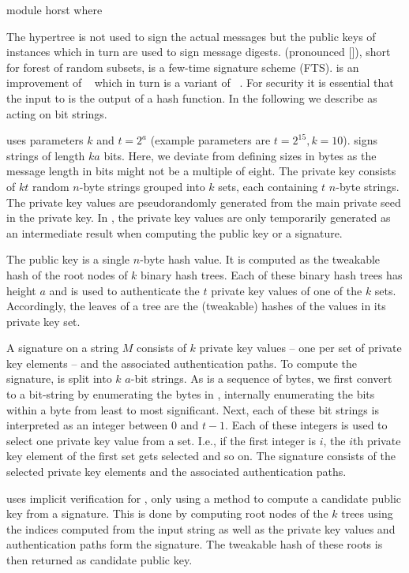 \begin{code}
  module horst where
\end{code}

The \spx hypertree \hyper is not used to sign the actual messages but the
public keys of \fors instances which in turn are used to sign message digests.
\fors (pronounced []), short for forest of random subsets, is a few-time
signature scheme (FTS). \fors is an improvement of \horst~\cite{Bernstein2015}
which in turn is a variant of \hors~\cite{Reyzin2002}.
For security it is essential that the input to \fors is the output of a
hash function. In the following we describe \fors as acting on bit strings.


\fors uses parameters $k$ and $t=2^a$ (example parameters are $t=2^{15}, k=10$).
\fors signs strings of length $ka$ bits. Here, we deviate from defining
sizes in bytes as the message length in bits might not be a multiple of eight.
The private key consists of $kt$
random $n$-byte strings grouped
into $k$ sets, each containing $t$ $n$-byte strings. The private key values
are pseudorandomly generated from the main private seed \sseed in the \spx private
key. In \spx, the \fors private key values are only temporarily generated as an
intermediate result when computing the public key or a signature.

The \fors public key is a single $n$-byte hash value. It is computed as the
tweakable hash of the root nodes of $k$ binary hash trees. Each of these binary
hash trees has height $a$ and is used to authenticate the $t$ private key
values of one of the $k$ sets. Accordingly, the leaves of a tree are the
(tweakable) hashes of the values in its private key set.

A signature on a string $M$ consists of $k$ private key values -- one per
set of private key elements -- and the
associated authentication paths. To compute the signature, \md is
split into $k$ $a$-bit strings. As \md is a sequence of bytes,
we first convert to a bit-string by enumerating the bytes in \md,
internally enumerating the bits within a byte from least to most significant.
Next, each of these bit strings is
interpreted as an integer between $0$ and $t-1$. Each of these integers is used to
select one private key value from a set. I.e., if the first integer is $i$, the
$i$th private key element of the first set gets selected and so on. The signature
consists of the selected private key elements and the associated authentication
paths.

\spx uses implicit verification for \fors, only using a method to compute
a candidate public key from a signature. This is done by computing root nodes
of the $k$ trees using the indices computed from the input string as well as
the private key values and authentication paths form the signature. The
tweakable hash of these roots is then returned as candidate public key.

